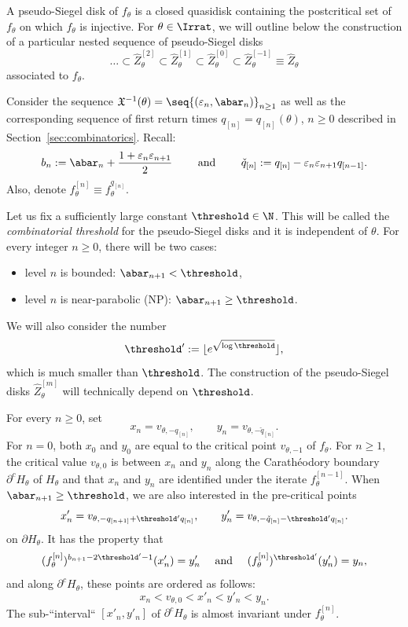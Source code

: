 \documentclass{amsart}
\begin{document}
A pseudo-Siegel disk of $f_\theta$ is a closed quasidisk containing the postcritical set of $f_\theta$ on which $f_\theta$ is injective.
For $\theta \in \Irrat$, we will outline below the construction of a particular nested sequence of pseudo-Siegel disks
\[
    \ldots \subset \hat{Z}^{[2]}_\theta \subset \hat{Z}^{[1]}_\theta \subset \hat{Z}^{[0]}_\theta \subset \hat{Z}^{[-1]}_\theta \equiv \hat{Z}_\theta
\]
associated to $f_\theta$.

Consider the sequence $\mathfrak{X}^{-1}(\theta) = \seq{ ( \varepsilon_n, \abar_n ) }_{n \geq 1}$ as well as the corresponding sequence of first return times $q_{[n]} = q_{[n]}(\theta)$, $n \geq 0$ described in Section~\ref{sec:combinatorics}. 
Recall:   \[
        b_n := \abar_n + \frac{1+ \varepsilon_n \varepsilon_{n+1}}{2} \qquad
        \text{ and } \qquad
        \check{q}_{[n]} := q_{[n]} - \varepsilon_n \varepsilon_{n+1} q_{[n-1]}.
    \]
Also, denote $f_\theta^{[n]} \equiv f_\theta^{q_{[n]}}$.

Let us fix a sufficiently large constant $\threshold \in \N$.
This will be called the \emph{combinatorial threshold} for the pseudo-Siegel disks and it is independent of $\theta$.
For every integer $n \geq 0$, there will be two cases:
\begin{itemize}
    \item level $n$ is bounded: $\abar_{n+1}< \threshold$,
    \item level $n$ is near-parabolic (NP): $\abar_{n+1} \geq \threshold$.
\end{itemize}
We will also consider the number
\[
\threshold' := \lfloor e^{\sqrt{\log \threshold}}\rfloor,
\]
which is much smaller than $\threshold$. 
The construction of the pseudo-Siegel disks $\hat{Z}_{\theta}^{[m]}$ will technically depend on $\threshold$.

For every $n \geq 0$, set
\begin{equation}
\label{eqn:xn-yn}
    x_n = v_{\theta,-q_{[n]}}, \qquad 
    y_n = v_{\theta,-\check{q}_{[n]}}.
\end{equation}
For $n = 0$, both $x_0$ and $y_0$ are equal to the critical point $v_{\theta,-1}$ of $f_\theta$. 
For $n \geq 1$, the critical value $v_{\theta,0}$ is between $x_n$ and $y_n$ along the Carath\'eodory boundary $\partial^c H_\theta$ of $H_\theta$ and that $x_n$ and $y_n$ are identified under the iterate $f_{\theta}^{[n-1]}$.
When $\abar_{n+1} \geq \threshold$, we are also interested in the pre-critical points 
\[
x'_n = v_{\theta,-q_{[n+1]} + \threshold' q_{[n]}},\qquad
y'_n = v_{\theta,-\check{q}_{[n]} - \threshold' q_{[n]}}.
\]
on $\partial H_\theta$. 
It has the property that 
\[
(f_\theta^{[n]})^{b_{n+1}-2\threshold'-1}(x'_n) = y'_n \quad \text{ and } \quad (f_\theta^{[n]})^{\threshold'}(y'_n) = y_n,
\]
and along $\partial^c H_\theta$, these points are ordered as follows: 
\[
x_n < v_{\theta,0} < x'_n < y'_n < y_n.
\]
The sub-``interval`` $\left[x'_n, y'_n\right]$ of $\partial^c H_\theta$ is almost invariant under $f_\theta^{[n]}$.
\end{document}
